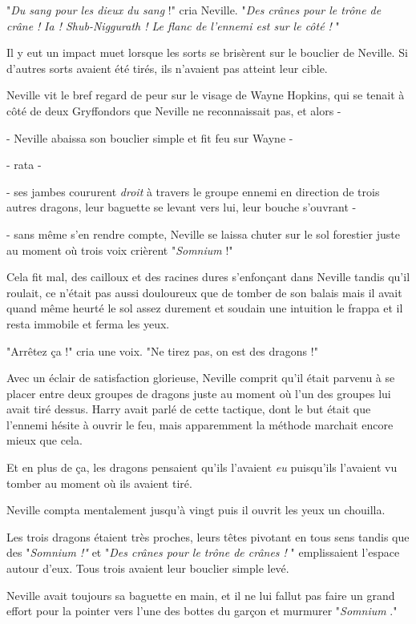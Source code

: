 "\emph{Du sang pour les dieux du sang}  !" cria Neville. "\emph{Des crânes pour le trône de crâne !}  \emph{Ia ! Shub-Niggurath ! Le flanc de l'ennemi est sur le côté !} "

Il y eut un impact muet lorsque les sorts se brisèrent sur le bouclier de Neville. Si d'autres sorts avaient été tirés, ils n'avaient pas atteint leur cible.

Neville vit le bref regard de peur sur le visage de Wayne Hopkins, qui se tenait à côté de deux Gryffondors que Neville ne reconnaissait pas, et alors -

- Neville abaissa son bouclier simple et fit feu sur Wayne -

- rata -

- ses jambes coururent \emph{droit}  à travers le groupe ennemi en direction de trois autres dragons, leur baguette se levant vers lui, leur bouche s'ouvrant -

- sans même s'en rendre compte, Neville se laissa chuter sur le sol forestier juste au moment où trois voix crièrent "\emph{Somnium}  !"

Cela fit mal, des cailloux et des racines dures s'enfonçant dans Neville tandis qu'il roulait, ce n'était pas aussi douloureux que de tomber de son balais mais il avait quand même heurté le sol assez durement et soudain une intuition le frappa et il resta immobile et ferma les yeux.

"Arrêtez ça !" cria une voix. "Ne tirez pas, on est des dragons !"

Avec un éclair de satisfaction glorieuse, Neville comprit qu'il était parvenu à se placer entre deux groupes de dragons juste au moment où l'un des groupes lui avait tiré dessus. Harry avait parlé de cette tactique, dont le but était que l'ennemi hésite à ouvrir le feu, mais apparemment la méthode marchait encore mieux que cela.

Et en plus de ça, les dragons pensaient qu'ils l'avaient \emph{eu}  puisqu'ils l'avaient vu tomber au moment où ils avaient tiré.

Neville compta mentalement jusqu'à vingt puis il ouvrit les yeux un chouilla.

Les trois dragons étaient très proches, leurs têtes pivotant en tous sens tandis que des "\emph{Somnium !" } et "\emph{Des crânes pour le trône de crânes !} " emplissaient l'espace autour d'eux. Tous trois avaient leur bouclier simple levé.

Neville avait toujours sa baguette en main, et il ne lui fallut pas faire un grand effort pour la pointer vers l'une des bottes du garçon et murmurer "\emph{Somnium} ."

